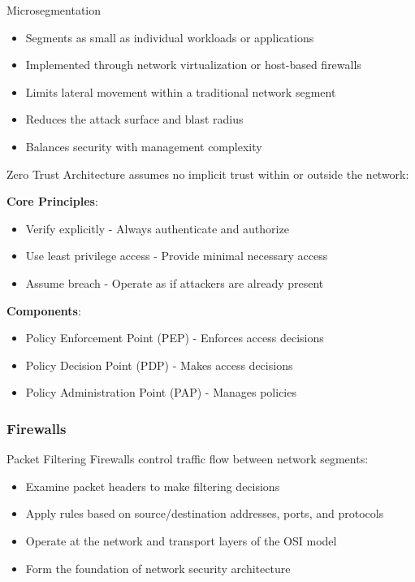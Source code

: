 \begin{definition}{Microsegmentation}
\begin{itemize}
    \item Segments as small as individual workloads or applications
    \item Implemented through network virtualization or host-based firewalls
    \item Limits lateral movement within a traditional network segment
    \item Reduces the attack surface and blast radius
    \item Balances security with management complexity
\end{itemize}
\end{definition}

\begin{concept}{Zero Trust Architecture}
assumes no implicit trust within or outside the network:

\textbf{Core Principles}:
    \begin{itemize}
        \item Verify explicitly - Always authenticate and authorize
        \item Use least privilege access - Provide minimal necessary access
        \item Assume breach - Operate as if attackers are already present
    \end{itemize}
    \textbf{Components}:
    \begin{itemize}
        \item Policy Enforcement Point (PEP) - Enforces access decisions
        \item Policy Decision Point (PDP) - Makes access decisions
        \item Policy Administration Point (PAP) - Manages policies
    \end{itemize}
\end{concept}



\multend

\subsubsection{Firewalls}


\begin{definition}{Packet Filtering Firewalls}
control traffic flow between network segments:
\begin{itemize}
    \item Examine packet headers to make filtering decisions
    \item Apply rules based on source/destination addresses, ports, and protocols
    \item Operate at the network and transport layers of the OSI model
    \item Form the foundation of network security architecture
\end{itemize}
\end{definition}

